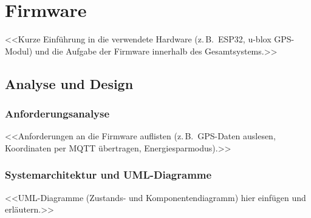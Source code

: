 
\section{Firmware}
\label{sec:firmware}

<<Kurze Einführung in die verwendete Hardware (z.\,B.\ ESP32, u-blox GPS-Modul)
und die Aufgabe der Firmware innerhalb des Gesamtsystems.>>

\subsection{Analyse und Design}


\subsubsection{Anforderungsanalyse}
<<Anforderungen an die Firmware auflisten (z.\,B.\ GPS-Daten auslesen,
Koordinaten per MQTT übertragen, Energiesparmodus).>>

\subsubsection{Systemarchitektur und UML-Diagramme}
<<UML-Diagramme (Zustands- und Komponentendiagramm) hier einfügen und erläutern.>>

